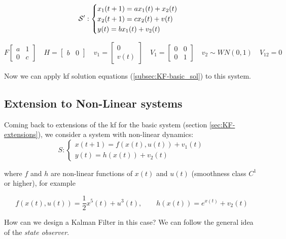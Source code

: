\begin{remark}
    \[
        \mathcal{S}':
        \begin{cases}
            x_1(t+1) = ax_1(t) + x_2(t) \\
            x_2(t+1) = cx_2(t) + v(t) \\
            y(t) = bx_1(t) + v_2(t)
        \end{cases}
    \]

    \[
        F\begin{bmatrix}
            a & 1 \\
            0 & c
        \end{bmatrix}
        \quad H = \begin{bmatrix}
            b & 0
        \end{bmatrix}
        \quad v_1 = \begin{bmatrix}
            0 \\ v(t)
        \end{bmatrix}
        \quad V_1 = \begin{bmatrix}
            0 & 0 \\
            0 & 1
        \end{bmatrix}
        \quad v_2 \sim WN(0,1)
        \quad V_{12} = 0
    \]

    Now we can apply \gls{kf} solution equations (\ref{subsec:KF-basic_sol}) to this system.
\end{remark}

\subsection{Extension to Non-Linear systems}\label{subsec:KF_non-lin_ext}
Coming back to extensions of the \gls{kf} for the basic system (section \ref{sec:KF-extensions}), we consider a system with non-linear dynamics:
\[
    S: \begin{cases}
        x(t+1) = f(x(t), u(t)) + v_1(t) \\
        y(t) = h(x(t)) + v_2(t)
    \end{cases}
\]

where $f$ and $h$ are non-linear functions of $x(t)$ and $u(t)$ (smoothness class $C^1$ or higher), for example

\vspace{-15pt}

\[
    f(x(t), u(t)) = \frac{1}{2} x^5(t) + u^3(t)  , \qquad h(x(t)) = e^{x(t)} + v_2(t)
\]

How can we design a Kalman Filter in this case? We can follow the general idea of the \emph{state observer}. 

